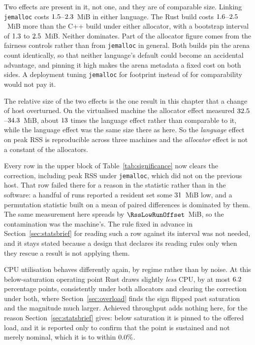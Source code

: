 \documentclass[english,oneside,a4paper,censored,csm,software-track-2020]{HYthesisML}
\begin{document}
Two effects are present in it, not one, and they are of comparable size. Linking \texttt{jemalloc}
costs $1.5$--$2.3$~MiB in either language. The Rust build costs
$1.6$--$2.5$~MiB more than the C++ build under either allocator, with a
bootstrap interval of $1.3$ to $2.5$~MiB. Neither dominates. Part of the
allocator figure comes from the fairness controls rather than from \texttt{jemalloc} in general.
Both builds pin the arena count identically, so that neither language's default could become an
accidental advantage, and pinning it high makes the arena metadata a fixed cost on both sides. A
deployment tuning \texttt{jemalloc} for footprint instead of for comparability would not pay it.

The relative size of the two effects is the one result in this chapter that a change of host
overturned. On the virtualised machine the allocator effect measured
$32.5$--$34.3$~MiB, about $13$ times the language
effect rather than comparable to it, while the language effect was the same size there as here. So the \emph{language} effect on peak RSS is reproducible across
three machines and the \emph{allocator} effect is not a constant of the allocators.

Every row in the upper block of Table~\ref{tab:significance} now clears the correction, including
peak RSS under \texttt{jemalloc}, which did not on the previous host. That row failed there for a
reason in the statistic rather than in the software: a handful of runs reported a resident set some
$31$~MiB low, and a permutation statistic built on a mean of paired differences
is dominated by them. The same measurement here spreads by $\RssLowRunOffset$~MiB, so the
contamination was the machine's. The rule fixed in advance in Section~\ref{sec:statsbrief} for reading
such a row against its interval was not needed, and it stays stated because a design that declares
its reading rules only when they rescue a result is not applying them.

CPU utilisation behaves differently again, by regime rather than by noise. At this
below-saturation operating point Rust draws slightly \emph{less} CPU, by at most
$6.2$ percentage points, consistently under both allocators and clearing the correction
under both, where Section~\ref{sec:overload} finds the sign flipped past saturation and the
magnitude much larger. Achieved throughput adds nothing here, for the reason
Section~\ref{sec:statsbrief} gives: below saturation it is pinned to the offered load, and it is
reported only to confirm that the point is sustained and not merely nominal, which it is to within
$0.0\%$.
\end{document}
